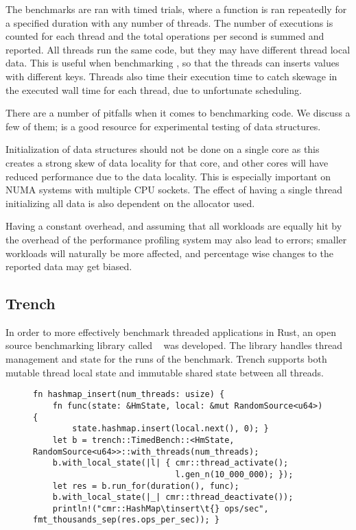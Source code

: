 The benchmarks are ran with timed trials, where a function is ran repeatedly for a specified
duration with any number of threads. The number of executions is counted for each thread and the
total operations per second is summed and reported. All threads run the same code, but they may
have different thread local data. This is useful when benchmarking , so that
the threads can inserts values with different keys. Threads also time their execution time to catch
skewage in the executed wall time for each thread, due to unfortunate scheduling.

There are a number of pitfalls when it comes to benchmarking code. We discuss a few of them;
\cite{rare} is a good resource for experimental testing of data structures.

Initialization of data structures should not be done on a single core as this creates
a strong skew of data locality for that core, and other cores will have reduced performance due to
the data locality. This is especially important on NUMA systems with multiple CPU sockets.
The effect of having a single thread initializing all data is also dependent on the allocator used.

Having a constant overhead, and assuming that all workloads are equally hit by the overhead of the
performance profiling system may also lead to errors; smaller workloads will naturally be more
affected, and percentage wise changes to the reported data may get biased.


\subsection{Trench}


In order to more effectively benchmark threaded applications in Rust, an open source benchmarking library
called ~\cite{trench} was developed. The library handles thread management and state
for the runs of the benchmark. Trench supports both mutable thread local state and immutable shared
state between all threads.

\begin{figure}[ht]
\begin{lstlisting}[style=Rust,
label=lst:trench-ex,caption=\code{Hashmap::insert} benchmark using \code{trench}]
fn hashmap_insert(num_threads: usize) {
    fn func(state: &HmState, local: &mut RandomSource<u64>) {
        state.hashmap.insert(local.next(), 0); }
    let b = trench::TimedBench::<HmState, RandomSource<u64>>::with_threads(num_threads);
    b.with_local_state(|l| { cmr::thread_activate();
                             l.gen_n(10_000_000); });
    let res = b.run_for(duration(), func);
    b.with_local_state(|_| cmr::thread_deactivate());
    println!("cmr::HashMap\tinsert\t{} ops/sec", fmt_thousands_sep(res.ops_per_sec)); }
\end{lstlisting}
\end{figure}



